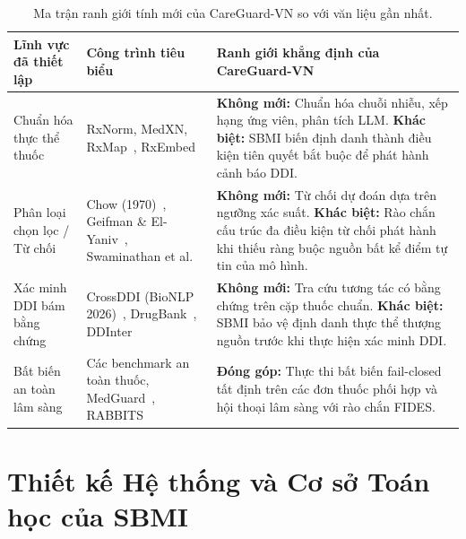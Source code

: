 \documentclass[11pt]{article}
\begin{document}
\begin{table}[H]
\centering
\caption{Ma trận ranh giới tính mới của CareGuard-VN so với văn liệu gần nhất.}
\label{tab:novelty_vi}
\scriptsize
\begin{tabularx}{\textwidth}{p{2.8cm}p{3.2cm}X}
\toprule
\textbf{Lĩnh vực đã thiết lập} & \textbf{Công trình tiêu biểu} & \textbf{Ranh giới khẳng định của CareGuard-VN} \\
\midrule
Chuẩn hóa thực thể thuốc & RxNorm, MedXN, RxMap~\cite{korpela2026rxmap}, RxEmbed~\cite{huser2025rxembed} & \textbf{Không mới:} Chuẩn hóa chuỗi nhiễu, xếp hạng ứng viên, phân tích LLM. \textbf{Khác biệt:} SBMI biến định danh thành điều kiện tiên quyết bắt buộc để phát hành cảnh báo DDI. \\
\addlinespace
Phân loại chọn lọc / Từ chối & Chow (1970)~\cite{chow1970}, Geifman \& El-Yaniv~\cite{geifman2017selective}, Swaminathan et al.~\cite{swaminathan2024selective} & \textbf{Không mới:} Từ chối dự đoán dựa trên ngưỡng xác suất. \textbf{Khác biệt:} Rào chắn cấu trúc đa điều kiện từ chối phát hành khi thiếu ràng buộc nguồn bất kể điểm tự tin của mô hình. \\
\addlinespace
Xác minh DDI bám bằng chứng & CrossDDI (BioNLP 2026)~\cite{crossddi2026}, DrugBank~\cite{wishart2018drugbank}, DDInter~\cite{tian2025ddinter} & \textbf{Không mới:} Tra cứu tương tác có bằng chứng trên cặp thuốc chuẩn. \textbf{Khác biệt:} SBMI bảo vệ định danh thực thể thượng nguồn trước khi thực hiện xác minh DDI. \\
\addlinespace
Bất biến an toàn lâm sàng & Các benchmark an toàn thuốc, MedGuard~\cite{chen2024medguard}, RABBITS~\cite{gallifant2024rabbits} & \textbf{Đóng góp:} Thực thi bất biến fail-closed tất định trên các đơn thuốc phối hợp và hội thoại lâm sàng với rào chắn FIDES. \\
\bottomrule
\end{tabularx}
\end{table}

\section{Thiết kế Hệ thống và Cơ sở Toán học của SBMI}
\end{document}
